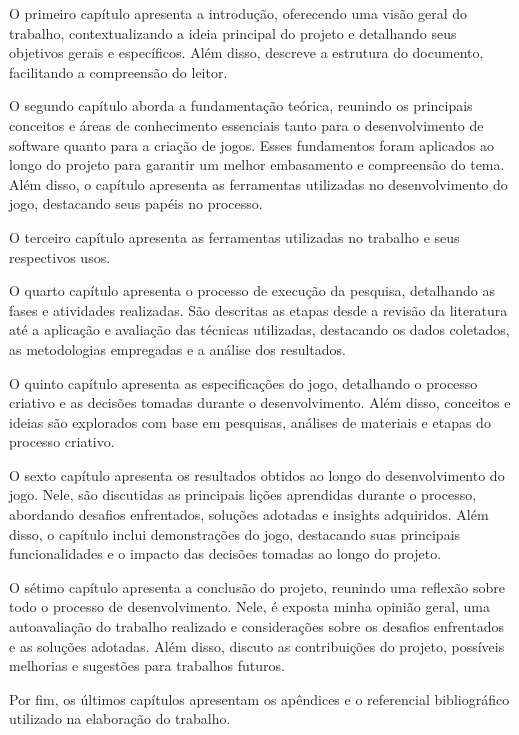 O primeiro capítulo apresenta a introdução, oferecendo uma visão geral do trabalho, contextualizando a ideia principal do projeto e detalhando seus objetivos gerais e específicos. Além disso, descreve a estrutura do documento, facilitando a compreensão do leitor.

O segundo capítulo aborda a fundamentação teórica, reunindo os principais conceitos e áreas de conhecimento essenciais tanto para o desenvolvimento de software quanto para a criação de jogos. Esses fundamentos foram aplicados ao longo do projeto para garantir um melhor embasamento e compreensão do tema. Além disso, o capítulo apresenta as ferramentas utilizadas no desenvolvimento do jogo, destacando seus papéis no processo.

O terceiro capítulo apresenta as ferramentas utilizadas no trabalho e seus respectivos usos.

O quarto capítulo apresenta o processo de execução da pesquisa, detalhando as fases e atividades realizadas. São descritas as etapas desde a revisão da literatura até a aplicação e avaliação das técnicas utilizadas, destacando os dados coletados, as metodologias empregadas e a análise dos resultados.

O quinto capítulo apresenta as especificações do jogo, detalhando o processo criativo e as decisões tomadas durante o desenvolvimento. Além disso, conceitos e ideias são explorados com base em pesquisas, análises de materiais e etapas do processo criativo.

O sexto capítulo apresenta os resultados obtidos ao longo do desenvolvimento do jogo. Nele, são discutidas as principais lições aprendidas durante o processo, abordando desafios enfrentados, soluções adotadas e insights adquiridos. Além disso, o capítulo inclui demonstrações do jogo, destacando suas principais funcionalidades e o impacto das decisões tomadas ao longo do projeto.

O sétimo capítulo apresenta a conclusão do projeto, reunindo uma reflexão sobre todo o processo de desenvolvimento. Nele, é exposta minha opinião geral, uma autoavaliação do trabalho realizado e considerações sobre os desafios enfrentados e as soluções adotadas. Além disso, discuto as contribuições do projeto, possíveis melhorias e sugestões para trabalhos futuros.

Por fim, os últimos capítulos apresentam os apêndices e o referencial bibliográfico utilizado na elaboração do trabalho.
